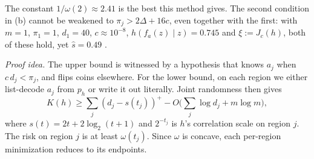 The constant $1/\omega(2)\approx2.41$ is the best this method gives. The second condition in (b) cannot be weakened to $\pi_j>2\Delta+16c$, even together with the first: with $m=1$, $\pi_1=1$, $d_1=40$, $c\approx10^{-8}$, $h(f_a(z)\mid z)=0.745$ and $\xi:=J_c(h)$, both of these hold, yet $\hat s=0.49$ .

\emph{Proof idea.} The upper bound is witnessed by a hypothesis that knows $a_j$ when $c\,d_j<\pi_j$, and flips coins elsewhere. For the lower bound, on each region we either list-decode $a_j$ from $p_h$ or write it out literally. Joint randomness then gives
\[
K(h)\ge\sum_j(d_j-s(t_j))^+-O\Big(\sum_j\log d_j+m\log m\Big),
\]
where $s(t)=2t+2\log_2(t+1)$ and $2^{-t_j}$ is $h$'s correlation scale on region $j$. The risk on region $j$ is at least $\omega(t_j)$. Since $\omega$ is concave, each per-region minimization reduces to its endpoints.

